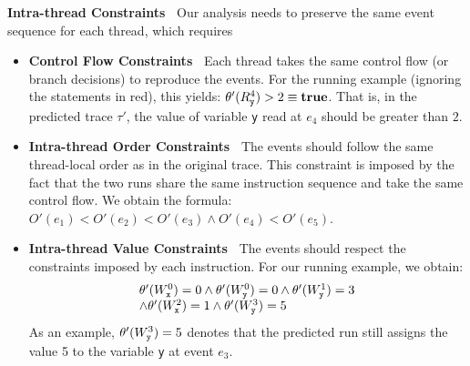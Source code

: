 {\bf Intra-thread Constraints\ } Our analysis needs to preserve the 
same event sequence for each thread, which requires 

\begin{itemize}
\item {\bf Control Flow Constraints\ } Each thread takes the same control flow
(or branch decisions) to reproduce the events.
 For the running example (ignoring the statements in red), this 
yields: $\theta'(R_{\tt y}^4) > 2 \equiv {\bf true}$.
That is, in the predicted trace $\tau'$, the value of variable {\tt y} 
read at $e_4$ should be greater than $2$. 


\item {\bf Intra-thread Order Constraints\ } The events should follow 
the same thread-local order as in the original trace. This constraint 
is imposed by the fact that the two runs share the same instruction 
sequence and take the same control flow. 
We obtain the  formula: $O'(e_1) < O'(e_2) < O'(e_3) \wedge O'(e_4) < O'(e_5)$.

\item {\bf Intra-thread Value Constraints\ } The events should respect the 
constraints imposed by each instruction.
 For our running example, we obtain:
$$
\begin{array}{l}
	\theta'(W_{\tt x}^0) = 0 \wedge \theta'(W_{\tt y}^0) = 0 \wedge \theta'(W_{\tt y}^1) = 3 \\ 
	\wedge	\theta'(W_{\tt x}^2) = 1 \wedge \theta'(W_{\tt y}^3) = 5
	\end{array}
$$
As an example, $\theta'(W_{\tt y}^3)= 5$ denotes that the predicted run still assigns the value 5 to the variable {\tt y}  at event $e_3$.
\end{itemize}





